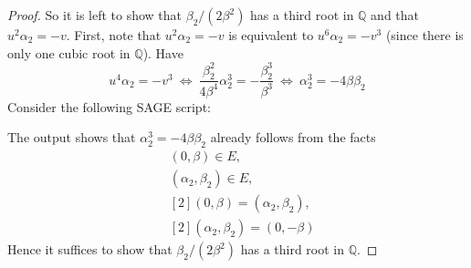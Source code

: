 \documentclass{scrartcl}
\newcommand{\Q}{\mathbb{Q}}
\theoremstyle{definition}
\begin{document}
\begin{proof}
    So it is left to show that $\beta_2/(2\beta^2)$ has a third root in $\Q$ and that $u^2 \alpha_2 = -v$.
    First, note that $u^2 \alpha_2 = -v$ is equivalent to $u^6 \alpha_2 = -v^3$ (since there is only one cubic root in $\Q$).
    Have
    \begin{equation*}
        u^4 \alpha_2 = -v^3 \ \Leftrightarrow \ \frac {\beta_2^2} {4\beta^4} \alpha_2^3 = -\frac {\beta_2^3} {\beta^3} \ \Leftrightarrow \ \alpha_2^3 = -4 \beta \beta_2
    \end{equation*}
    Consider the following SAGE script:
    
    The output shows that $\alpha_2^3 = -4 \beta \beta_2$ already follows from the facts
    \begin{align*}
        &(0, \beta) \in E, \\
        &(\alpha_2, \beta_2) \in E, \\
        &[2](0, \beta) = (\alpha_2, \beta_2), \\
        &[2](\alpha_2, \beta_2) = (0, -\beta)
    \end{align*}
    Hence it suffices to show that $\beta_2/(2\beta^2)$ has a third root in $\Q$.
\end{proof}
\end{document}
